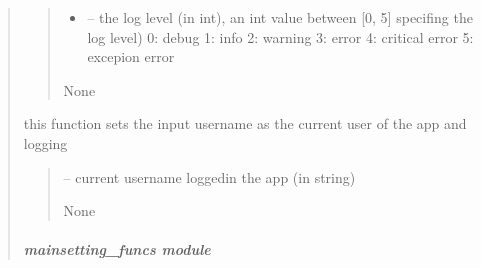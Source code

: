 \documentclass[letterpaper,10pt,english]{sphinxmanual}
\begin{document}
\begin{quote}
\begin{savenotes}
\begin{fulllineitems}
\begin{savenotes}
\begin{fulllineitems}
\begin{quote}
\begin{description}
\begin{itemize}
\item {} 
\sphinxAtStartPar
{} – the log level (in int), an int value between {[}0, 5{]} specifing the log level)
0: debug
1: info
2: warning
3: error
4: critical error
5: excepion error

\end{itemize}

\sphinxAtStartPar
None

\end{description}\end{quote}

\end{fulllineitems}\end{savenotes}


\begin{savenotes}\begin{fulllineitems}
\label{\detokenize{setting/backend/logging_funcs:oxin.backend.logging_funcs.app_logger.set_current_user}}
\pysigstartsignatures
{}
\pysigstopsignatures
\sphinxAtStartPar
this function sets the input username as the current user of the app and logging
\begin{quote}\begin{description}
\sphinxAtStartPar
{} – current username logged\sphinxhyphen{}in the app (in string)

\sphinxAtStartPar
None

\end{description}\end{quote}

\end{fulllineitems}\end{savenotes}


\end{fulllineitems}\end{savenotes}


\sphinxstepscope


\subparagraph{mainsetting\_funcs module}
\label{\detokenize{setting/backend/mainsetting_funcs:module-oxin.backend.mainsetting_funcs}}\label{\detokenize{setting/backend/mainsetting_funcs:mainsetting-funcs-module}}\label{\detokenize{setting/backend/mainsetting_funcs::doc}}


\end{quote}
\end{document}
